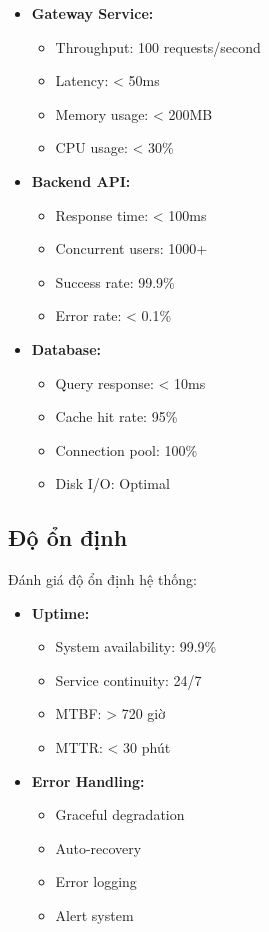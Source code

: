 \begin{itemize}
    \item \textbf{Gateway Service:}
    \begin{itemize}
        \item Throughput: 100 requests/second
        \item Latency: < 50ms
        \item Memory usage: < 200MB
        \item CPU usage: < 30\%
    \end{itemize}
    
    \item \textbf{Backend API:}
    \begin{itemize}
        \item Response time: < 100ms
        \item Concurrent users: 1000+
        \item Success rate: 99.9\%
        \item Error rate: < 0.1\%
    \end{itemize}
    
    \item \textbf{Database:}
    \begin{itemize}
        \item Query response: < 10ms
        \item Cache hit rate: 95\%
        \item Connection pool: 100\%
        \item Disk I/O: Optimal
    \end{itemize}
\end{itemize}

\subsection{Độ ổn định}
\hspace{0.5cm}Đánh giá độ ổn định hệ thống:

\begin{itemize}
    \item \textbf{Uptime:}
    \begin{itemize}
        \item System availability: 99.9\%
        \item Service continuity: 24/7
        \item MTBF: > 720 giờ
        \item MTTR: < 30 phút
    \end{itemize}
    
    \item \textbf{Error Handling:}
    \begin{itemize}
        \item Graceful degradation
        \item Auto-recovery
        \item Error logging
        \item Alert system
    \end{itemize}
\end{itemize}

